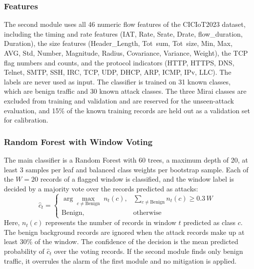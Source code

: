 \documentclass[]{interact}
\theoremstyle{plain}%
\theoremstyle{definition}
\theoremstyle{remark}
\begin{document}
\subsubsection{Features}
The second module uses all 46 numeric flow features of the CICIoT2023 dataset, including the timing and rate features (IAT, Rate, Srate, Drate, flow\_duration, Duration), the size features (Header\_Length, Tot~sum, Tot~size, Min, Max, AVG, Std, Number, Magnitude, Radius, Covariance, Variance, Weight), the TCP flag numbers and counts, and the protocol indicators (HTTP, HTTPS, DNS, Telnet, SMTP, SSH, IRC, TCP, UDP, DHCP, ARP, ICMP, IPv, LLC). The labels are never used as input. The classifier is trained on 31 known classes, which are benign traffic and 30 known attack classes. The three Mirai classes are excluded from training and validation and are reserved for the unseen-attack evaluation, and 15\% of the known training records are held out as a validation set for calibration.

\subsubsection{Random Forest with Window Voting}
The main classifier is a Random Forest with 60 trees, a maximum depth of 20, at least 3 samples per leaf and balanced class weights per bootstrap sample. Each of the $W = 20$ records of a flagged window is classified, and the window label is decided by a majority vote over the records predicted as attacks:
\begin{equation}
  \hat{c}_t =
  \begin{cases}
    \arg\max_{c \neq \text{Benign}} \; n_t(c), & \sum_{c \neq \text{Benign}} n_t(c) \ge 0.3\,W\\
    \text{Benign}, & \text{otherwise}
  \end{cases}
\end{equation}
Here, $n_t(c)$ represents the number of records in window $t$ predicted as class $c$. The benign background records are ignored when the attack records make up at least 30\% of the window. The confidence of the decision is the mean predicted probability of $\hat{c}_t$ over the voting records. If the second module finds only benign traffic, it overrules the alarm of the first module and no mitigation is applied.
\end{document}
